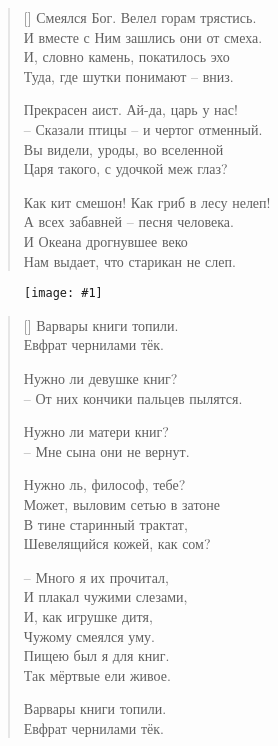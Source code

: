 \documentclass[12pt,a5paper,twoside]{article}
\newcommand{\pict}[1]{\thispagestyle{empty}\begin{figure}[H]\begin{center}\texttt{[image: \#1]}\end{center}\end{figure}\newpage}
\begin{document}
\settowidth{\versewidth}{Смеялся Бог. Велел горам трястись.}
\begin{verse}[\versewidth]
Смеялся Бог. Велел горам трястись.\\
И вместе с Ним зашлись они от смеха.\\
И, словно камень, покатилось эхо\\
Туда, где шутки понимают – вниз.

Прекрасен аист. Ай-да, царь у нас!\\
– Сказали птицы – и чертог отменный.\\
Вы видели, уроды, во вселенной\\
Царя такого, с удочкой меж глаз?

Как кит смешон! Как гриб в лесу нелеп!\\
А всех забавней – песня человека.\\
И Океана дрогнувшее веко\\
Нам выдает, что старикан не слеп.
\end{verse}
\newpage

\pict{picts/Varvari_knigi_topili} 


\settowidth{\versewidth}{Варвары книги топили.}
\begin{verse}[\versewidth]
Варвары книги топили.\\
Евфрат чернилами тёк.

Нужно ли девушке книг?\\
– От них кончики пальцев пылятся.

Нужно ли матери книг?\\
– Мне сына они не вернут.

Нужно ль, философ, тебе?\\
Может, выловим сетью в затоне\\
В тине старинный трактат,\\
Шевелящийся кожей, как сом?

– Много я их прочитал,\\
И плакал чужими слезами,\\
И, как игрушке дитя,\\
Чужому смеялся уму.\\ 
Пищею был я для книг.\\
Так мёртвые ели живое.

Варвары книги топили.\\
Евфрат чернилами тёк.
\end{verse}
\newpage		
\end{document}
